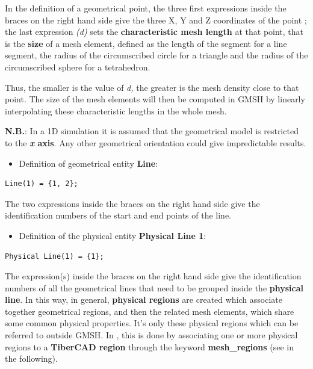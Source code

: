 In the definition of a geometrical point, the three first expressions inside the braces on the right hand side give the three X, Y and Z coordinates of the point ; the last expression \textit{(d)} sets the \textbf{characteristic mesh length} at that point, that is the \textbf{size} of a mesh element, defined as the length of the segment for a line segment, the radius of the circumscribed circle for a triangle and the radius of the circumscribed sphere for a tetrahedron.

Thus, the smaller is the value of \textit{d,} the greater is the mesh density close to that point. The size of the mesh elements will then be computed in GMSH by linearly interpolating these characteristic lengths in the whole mesh.
\vspace{12pt}


\textbf{N.B.}: In a 1D simulation it is  assumed that the geometrical model is  restricted to  the  \textbf{\textit{x} axis}. Any  other geometrical orientation  could  give     impredictable results.

\begin{itemize}
	\item Definition of geometrical entity \textbf{Line}:
\end{itemize}
  
\begin{verbatim}
Line(1) = {1, 2};
\end{verbatim}
The two expressions inside the braces on the right hand side  give the identification numbers of the start and end points of the line.

\begin{itemize}
	\item Definition of the physical entity \textbf{Physical Line 1}:
\end{itemize}

\begin{verbatim}
Physical Line(1) = {1};
\end{verbatim}

The expression(s) inside the braces on the right hand side  give the identification numbers of all the geometrical lines that need to be grouped inside the \textbf{physical line}.
In this way, in general, \textbf{physical regions} are created which associate together geometrical regions, and then the related mesh elements, which share some common physical properties. It's only these physical regions which can be referred to outside GMSH. In \TiberCAD{}, this is done by associating one or more physical regions to a \textbf{TiberCAD{} region }through the keyword \textbf{mesh\_regions} (see in the following).

